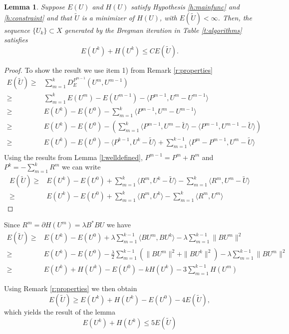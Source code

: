 \documentclass[11pt]{article}
\theoremstyle{plain}
\newtheorem{Lemma}{Lemma}[section]
\begin{document}
\begin{Lemma}\label{l:uniformbound}
Suppose $E(U)$ and $H(U)$ satisfy Hypothesis \ref{h:mainfunc} and \ref{h:constraint} and that $\tilde{U}$ is a minimizer of $H(U)$, with $E(\tilde{U})<\infty$. Then, the sequence $\{U_k\} \subset X$ generated by the Bregman iteration in Table \ref{t:algorithms} satisfies $$E(U^k) + H(U^k) \leq C E(\tilde{U}).$$
\end{Lemma}
\begin{proof}
To show the result we use item 1) from Remark \ref{r:properties}
\begin{align*}
E(\tilde{U}) \geq & \sum_{m=1}^k D^{P^{m-1}}_E(U^m,U^{m-1})\\
\geq &  \sum_{m=1}^k E(U^m) - E(U^{m-1}) - \langle P^{m-1}, U^m-U^{m-1} \rangle\\
\geq & E(U^k) - E(U^0) -  \sum_{m=1}^k  \langle P^{m-1}, U^m-U^{m-1} \rangle\\
\geq & E(U^k) - E(U^0) - \left(  \sum_{m=1}^k  \langle P^{m-1}, U^m-\tilde{U} \rangle - \langle P^{m-1}, U^{m-1}-\tilde{U} \rangle \right)   \\
\geq & E(U^k) - E(U^0) - \langle P^{k-1}, U^k - \tilde{U} \rangle +   \sum_{m=1}^{k-1}  \langle P^m - P^{m-1}, U^m-\tilde{U} \rangle    \\
\end{align*}
Using the results from Lemma \ref{l:welldefined}, $P^{m-1} = P^m + R^m$ and $P^k = - \sum_{m=1}^k R^m$ we can write
\begin{align*}
E(\tilde{U}) \geq & E(U^k) - E(U^0) +  \sum_{m=1}^k  \langle R^m, U^k - \tilde{U} \rangle -  \sum_{m=1}^k \langle R^m, U^m - \tilde{U} \rangle\\
 \geq & E(U^k) - E(U^0) +  \sum_{m=1}^k  \langle R^m, U^k \rangle -  \sum_{m=1}^k \langle R^m, U^m  \rangle
\end{align*}
\end{proof}
Since $R^m = \partial H(U^m) = \lambda B^*BU$ we have 
\begin{align*}
E(\tilde{U}) \geq & E(U^k) - E(U^0)+  \lambda  \sum_{m=1}^{k-1} \langle BU^m, BU^k \rangle - \lambda \sum_{m=1}^{k-1} \| BU^m \|^2\\
 \geq & E(U^k) - E(U^0) -  \frac{\lambda}{2}  \sum_{m=1}^{k-1} \left (\|BU^m\|^2 + \|BU^k\|^2 \right ) - \lambda \sum_{m=1}^{k-1} \|BU^m\|^2\\
 \geq & E(U^k) +H(U^k) - E(U^0) - k H(U^k) -3  \sum_{m=1}^{k-1} H(U^m) 
\end{align*}

Using Remark \ref{r:properties} we then obtain
\[ E(\tilde{U}) \geq  E(U^k) +H(U^k) - E(U^0) - 4E(\tilde{U}),\]
which yields the result of the lemma
\[ E(U^k) +H(U^k) \leq 5 E(\tilde{U}) \]
\end{document}
